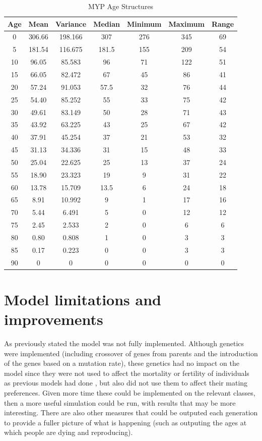 \documentclass[authoryearcitations]{UoYCSproject}
\begin{document}
\begin{table}[h]
\caption{MYP Age Structures}
\label{tbl:mypAge}
\begin{tabular}{c c c c c c c}
\textbf{Age} & \textbf{Mean} & \textbf{Variance} & \textbf{Median} & \textbf{Minimum} & \textbf{Maximum} & \textbf{Range} \\\hline
0 & 306.66 & 198.166 & 307 & 276 & 345 & 69 \\\hline
5 & 181.54 & 116.675 & 181.5 & 155 & 209 & 54 \\\hline
10 & 96.05 & 85.583 & 96 & 71 & 122 & 51 \\\hline
15 & 66.05 & 82.472 & 67 & 45 & 86 & 41 \\\hline
20 & 57.24 & 91.053 & 57.5 & 32 & 76 & 44 \\\hline
25 & 54.40 & 85.252 & 55 & 33 & 75 & 42 \\\hline
30 & 49.61 & 83.149 & 50 & 28 & 71 & 43 \\\hline
35 & 43.92 & 63.225 & 43 & 25 & 67 & 42 \\\hline
40 & 37.91 & 45.254 & 37 & 21 & 53 & 32 \\\hline
45 & 31.13 & 34.336 & 31 & 15 & 48 & 33 \\\hline
50 & 25.04 & 22.625 & 25 & 13 & 37 & 24 \\\hline
55 & 18.90 & 23.323 & 19 & 9 & 31 & 22 \\\hline
60 & 13.78 & 15.709 & 13.5 & 6 & 24 & 18 \\\hline
65 & 8.91 & 10.992 & 9 & 1 & 17 & 16 \\\hline
70 & 5.44 & 6.491 & 5 & 0 & 12 & 12 \\\hline
75 & 2.45 & 2.533 & 2 & 0 & 6 & 6 \\\hline
80 & 0.80 & 0.808 & 1 & 0 & 3 & 3 \\\hline
85 & 0.17 & 0.223 & 0 & 0  & 3 & 3 \\\hline
90 & 0 & 0 & 0 & 0 & 0 & 0
\end{tabular}
\end{table}

\section{Model limitations and improvements}
As previously stated the model was not fully implemented. Although genetics were implemented (including crossover of genes from parents and the introduction of the genes based on a mutation rate), these genetics had no impact on the model since they were not used to affect the mortality or fertility of individuals as previous models had done \cite{mateChoice2013}, but also did not use them to affect their mating preferences. Given more time these could be implemented on the relevant classes, then a more useful simulation could be run, with results that may be more interesting. There are also other measures that could be outputed each generation to provide a fuller picture of what is happening (such as outputing the ages at which people are dying and reproducing).
\end{document}
